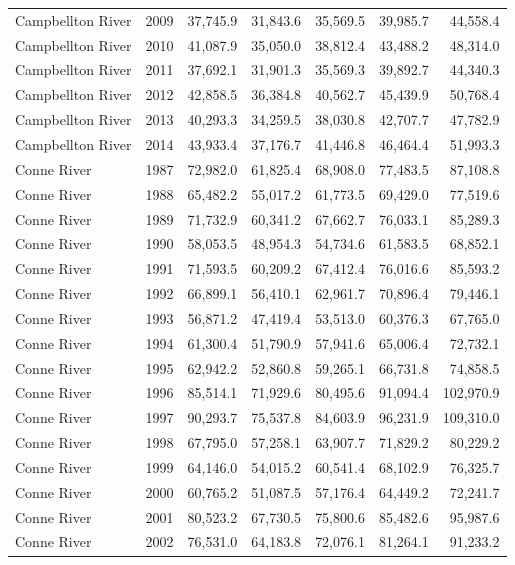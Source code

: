 \begin{longtable}{llrrrrr}
  Campbellton River & 2009 & 37,745.9 & 31,843.6 & 35,569.5 & 39,985.7 & 44,558.4 \\ 
  Campbellton River & 2010 & 41,087.9 & 35,050.0 & 38,812.4 & 43,488.2 & 48,314.0 \\ 
  Campbellton River & 2011 & 37,692.1 & 31,901.3 & 35,569.3 & 39,892.7 & 44,340.3 \\ 
  Campbellton River & 2012 & 42,858.5 & 36,384.8 & 40,562.7 & 45,439.9 & 50,768.4 \\ 
  Campbellton River & 2013 & 40,293.3 & 34,259.5 & 38,030.8 & 42,707.7 & 47,782.9 \\ 
  Campbellton River & 2014 & 43,933.4 & 37,176.7 & 41,446.8 & 46,464.4 & 51,993.3 \\ 
  Conne River & 1987 & 72,982.0 & 61,825.4 & 68,908.0 & 77,483.5 & 87,108.8 \\ 
  Conne River & 1988 & 65,482.2 & 55,017.2 & 61,773.5 & 69,429.0 & 77,519.6 \\ 
  Conne River & 1989 & 71,732.9 & 60,341.2 & 67,662.7 & 76,033.1 & 85,289.3 \\ 
  Conne River & 1990 & 58,053.5 & 48,954.3 & 54,734.6 & 61,583.5 & 68,852.1 \\ 
  Conne River & 1991 & 71,593.5 & 60,209.2 & 67,412.4 & 76,016.6 & 85,593.2 \\ 
  Conne River & 1992 & 66,899.1 & 56,410.1 & 62,961.7 & 70,896.4 & 79,446.1 \\ 
  Conne River & 1993 & 56,871.2 & 47,419.4 & 53,513.0 & 60,376.3 & 67,765.0 \\ 
  Conne River & 1994 & 61,300.4 & 51,790.9 & 57,941.6 & 65,006.4 & 72,732.1 \\ 
  Conne River & 1995 & 62,942.2 & 52,860.8 & 59,265.1 & 66,731.8 & 74,858.5 \\ 
  Conne River & 1996 & 85,514.1 & 71,929.6 & 80,495.6 & 91,094.4 & 102,970.9 \\ 
  Conne River & 1997 & 90,293.7 & 75,537.8 & 84,603.9 & 96,231.9 & 109,310.0 \\ 
  Conne River & 1998 & 67,795.0 & 57,258.1 & 63,907.7 & 71,829.2 & 80,229.2 \\ 
  Conne River & 1999 & 64,146.0 & 54,015.2 & 60,541.4 & 68,102.9 & 76,325.7 \\ 
  Conne River & 2000 & 60,765.2 & 51,087.5 & 57,176.4 & 64,449.2 & 72,241.7 \\ 
  Conne River & 2001 & 80,523.2 & 67,730.5 & 75,800.6 & 85,482.6 & 95,987.6 \\ 
  Conne River & 2002 & 76,531.0 & 64,183.8 & 72,076.1 & 81,264.1 & 91,233.2 \\ 

\end{longtable}
